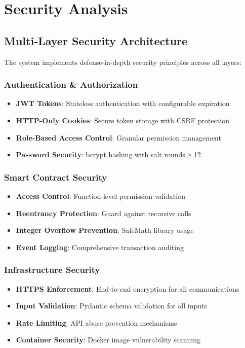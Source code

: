 \documentclass[12pt,a4paper]{article}
\begin{document}
\section{Security Analysis}

\subsection{Multi-Layer Security Architecture}
The system implements defense-in-depth security principles across all layers:

\subsubsection{Authentication \& Authorization}
\begin{itemize}
    \item \textbf{JWT Tokens}: Stateless authentication with configurable expiration
    \item \textbf{HTTP-Only Cookies}: Secure token storage with CSRF protection
    \item \textbf{Role-Based Access Control}: Granular permission management
    \item \textbf{Password Security}: bcrypt hashing with salt rounds ≥ 12
\end{itemize}

\subsubsection{Smart Contract Security}
\begin{itemize}
    \item \textbf{Access Control}: Function-level permission validation
    \item \textbf{Reentrancy Protection}: Guard against recursive calls
    \item \textbf{Integer Overflow Prevention}: SafeMath library usage
    \item \textbf{Event Logging}: Comprehensive transaction auditing
\end{itemize}

\subsubsection{Infrastructure Security}
\begin{itemize}
    \item \textbf{HTTPS Enforcement}: End-to-end encryption for all communications
    \item \textbf{Input Validation}: Pydantic schema validation for all inputs
    \item \textbf{Rate Limiting}: API abuse prevention mechanisms
    \item \textbf{Container Security}: Docker image vulnerability scanning
\end{itemize}
\end{document}
